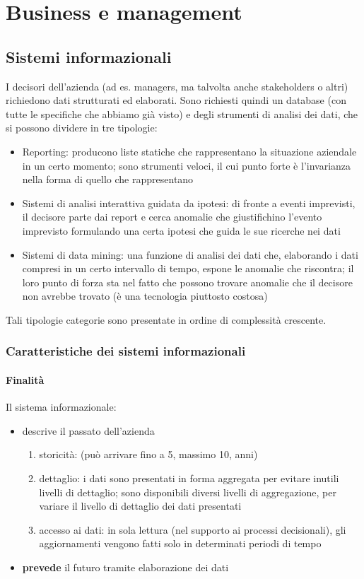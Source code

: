 \chapter{Business e management}
\label{chap:Business e management}

\section{Sistemi informazionali}
\label{sec:Sistemi informazionali}
I decisori dell'azienda (ad es. managers, ma talvolta anche stakeholders o altri) richiedono dati strutturati ed elaborati.
Sono richiesti quindi un database (con tutte le specifiche che abbiamo gi\`a visto) e degli strumenti di analisi dei dati, che si possono dividere in tre tipologie:
\begin{itemize}
  \item Reporting: producono liste statiche che rappresentano la situazione aziendale in un certo momento; sono strumenti veloci, il cui punto forte \`e l'invarianza nella forma di quello che rappresentano
  \item Sistemi di analisi interattiva guidata da ipotesi: di fronte a eventi imprevisti, il decisore parte dai report
  e cerca anomalie che giustifichino l'evento imprevisto formulando una certa ipotesi che guida
  le sue ricerche nei dati
  \item Sistemi di data mining: una funzione di analisi dei dati che, elaborando i dati compresi in un certo intervallo
  di tempo, espone le anomalie che riscontra; il loro punto di forza sta nel fatto che possono trovare anomalie che
  il decisore non avrebbe trovato (\`e una tecnologia piuttosto costosa)
\end{itemize}
Tali tipologie categorie sono presentate in ordine di complessit\`a crescente.

\subsection{Caratteristiche dei sistemi informazionali}
\label{sub:Caratteristiche dei sistemi informazionali}
\subsubsection{Finalit\`a}
Il sistema informazionale:
\begin{itemize}
  \item descrive il passato dell'azienda
  \begin{enumerate}
    \item storicit\`a: (pu\`o arrivare fino a 5, massimo 10, anni)
    \item dettaglio: i dati sono presentati in forma aggregata per evitare inutili
    livelli di dettaglio; sono disponibili diversi livelli di aggregazione, per variare
    il livello di dettaglio dei dati presentati
    \item accesso ai dati: in sola lettura (nel supporto ai processi decisionali),
    gli aggiornamenti vengono fatti solo in determinati periodi di tempo
  \end{enumerate}
  \item \textbf{prevede} il futuro tramite elaborazione dei dati
\end{itemize}
